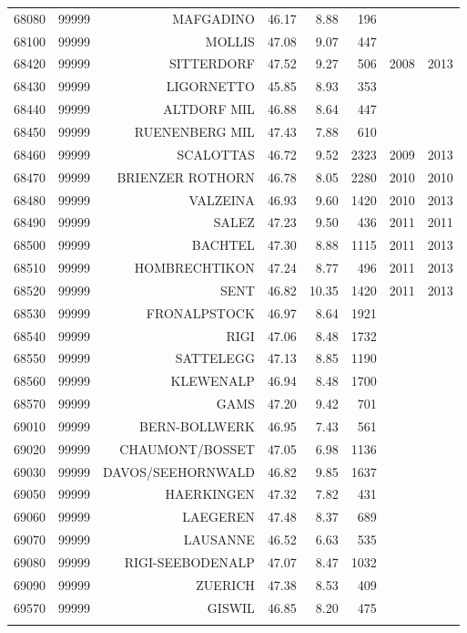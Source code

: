 \begin{longtable}{rrrrrrrr}
  68080 & 99999 & MAFGADINO & 46.17 & 8.88 & 196 &  &  \\ 
  68100 & 99999 & MOLLIS & 47.08 & 9.07 & 447 &  &  \\ 
  68420 & 99999 & SITTERDORF & 47.52 & 9.27 & 506 & 2008 & 2013 \\ 
  68430 & 99999 & LIGORNETTO & 45.85 & 8.93 & 353 &  &  \\ 
  68440 & 99999 & ALTDORF MIL & 46.88 & 8.64 & 447 &  &  \\ 
  68450 & 99999 & RUENENBERG MIL & 47.43 & 7.88 & 610 &  &  \\ 
  68460 & 99999 & SCALOTTAS & 46.72 & 9.52 & 2323 & 2009 & 2013 \\ 
  68470 & 99999 & BRIENZER ROTHORN & 46.78 & 8.05 & 2280 & 2010 & 2010 \\ 
  68480 & 99999 & VALZEINA & 46.93 & 9.60 & 1420 & 2010 & 2013 \\ 
  68490 & 99999 & SALEZ & 47.23 & 9.50 & 436 & 2011 & 2011 \\ 
  68500 & 99999 & BACHTEL & 47.30 & 8.88 & 1115 & 2011 & 2013 \\ 
  68510 & 99999 & HOMBRECHTIKON & 47.24 & 8.77 & 496 & 2011 & 2013 \\ 
  68520 & 99999 & SENT & 46.82 & 10.35 & 1420 & 2011 & 2013 \\ 
  68530 & 99999 & FRONALPSTOCK & 46.97 & 8.64 & 1921 &  &  \\ 
  68540 & 99999 & RIGI & 47.06 & 8.48 & 1732 &  &  \\ 
  68550 & 99999 & SATTELEGG & 47.13 & 8.85 & 1190 &  &  \\ 
  68560 & 99999 & KLEWENALP & 46.94 & 8.48 & 1700 &  &  \\ 
  68570 & 99999 & GAMS & 47.20 & 9.42 & 701 &  &  \\ 
  69010 & 99999 & BERN-BOLLWERK & 46.95 & 7.43 & 561 &  &  \\ 
  69020 & 99999 & CHAUMONT/BOSSET & 47.05 & 6.98 & 1136 &  &  \\ 
  69030 & 99999 & DAVOS/SEEHORNWALD & 46.82 & 9.85 & 1637 &  &  \\ 
  69050 & 99999 & HAERKINGEN & 47.32 & 7.82 & 431 &  &  \\ 
  69060 & 99999 & LAEGEREN & 47.48 & 8.37 & 689 &  &  \\ 
  69070 & 99999 & LAUSANNE & 46.52 & 6.63 & 535 &  &  \\ 
  69080 & 99999 & RIGI-SEEBODENALP & 47.07 & 8.47 & 1032 &  &  \\ 
  69090 & 99999 & ZUERICH & 47.38 & 8.53 & 409 &  &  \\ 
  69570 & 99999 & GISWIL & 46.85 & 8.20 & 475 &  &  \\ 
   \bottomrule
\hline
\label{tab:SW_Stations}
\end{longtable}
